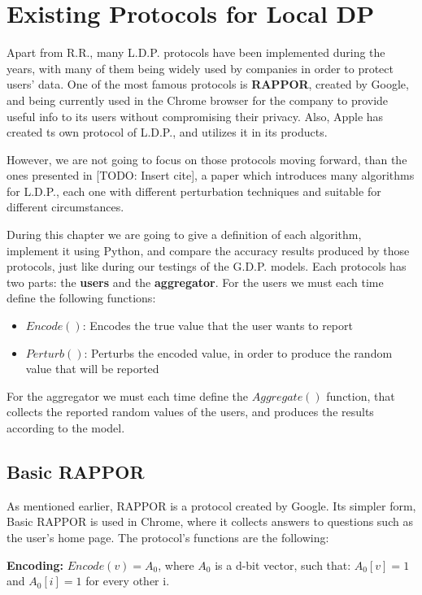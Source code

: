 

\section{Existing Protocols for Local DP}

Apart from R.R., many L.D.P. protocols have been implemented during the years, with many of them being widely used by companies in order to protect users' data. One of the most famous protocols is \textbf{RAPPOR}, created by Google, and being currently used in the Chrome browser for the company to provide useful info to its users without compromising their privacy. Also, Apple has created ts own protocol of L.D.P., and utilizes it in its products. 

However, we are not going to focus on those protocols moving forward, than the ones presented in [TODO: Insert cite], a paper which introduces many algorithms for L.D.P., each one with different perturbation techniques and suitable for different circumstances.

During this chapter we are going to give a definition of each algorithm, implement it using Python, and compare the accuracy results produced by those protocols, just like during our testings of the G.D.P. models. Each protocols has two parts: the \textbf{users} and the \textbf{aggregator}. For the users we must each time define the following functions:

\begin{itemize}
    \item $Encode()$: Encodes the true value that the user wants to report
    \item $Perturb()$: Perturbs the encoded value, in order to produce the random value that will be reported
\end{itemize}

For the aggregator we must each time define the  $Aggregate()$ function, that collects the reported random values of the users, and produces the results according to the model.

\subsection{Basic RAPPOR}
As mentioned earlier, RAPPOR is a protocol created by Google. Its simpler form, Basic RAPPOR is used in Chrome, where it collects answers to questions such as the user's home page. The protocol's functions are the following:

\textbf{Encoding:} $Encode(v) = A_0$, where $A_0$ is a d-bit vector, such that: $A_0[v] = 1$ and $A_0[i] = 1$ for every other i. 

